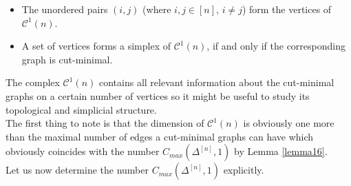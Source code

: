 \begin{itemize}
\item The unordered pairs \((i,j)\) (where \(i,j\in [n]\text{, }i\neq j\)) form the vertices of \(\mathcal{C}^1(n)\).
\item A set of vertices forms a simplex of \(\mathcal{C}^1(n)\), if and only if the corresponding graph is cut-minimal.
\end{itemize}

The complex \(\mathcal{C}^1(n)\) contains all relevant information about the cut-minimal graphs on a certain number of vertices so it might be useful to study its topological and simplicial structure.\\
The first thing to note is that the dimension of \(\mathcal{C}^1(n)\) is obviously one more than the maximal number of edges a cut-minimal graphs can have which obviously coincides with the number \(C_{max}(\Delta^{[n]},1)\) by Lemma \ref{lemma16}.
\\
Let us now determine the number \(C_{max}(\Delta^{[n]},1)\) explicitly.
